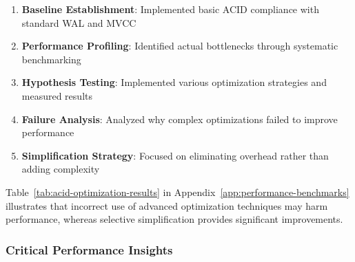 \documentclass[conference]{IEEEtran}
\begin{document}
\begin{itemize}[leftmargin=*]
\begin{enumerate}[leftmargin=*]
\item \textbf{Baseline Establishment}: Implemented basic ACID compliance with standard WAL and MVCC
\item \textbf{Performance Profiling}: Identified actual bottlenecks through systematic benchmarking
\item \textbf{Hypothesis Testing}: Implemented various optimization strategies and measured results
\item \textbf{Failure Analysis}: Analyzed why complex optimizations failed to improve performance
\item \textbf{Simplification Strategy}: Focused on eliminating overhead rather than adding complexity
\end{enumerate}
Table~\ref{tab:acid-optimization-results} in Appendix~\ref{app:performance-benchmarks} illustrates that incorrect use of advanced optimization techniques may harm performance, whereas selective simplification provides significant improvements.


\subsubsection{Critical Performance Insights}


\end{itemize}
\end{document}
